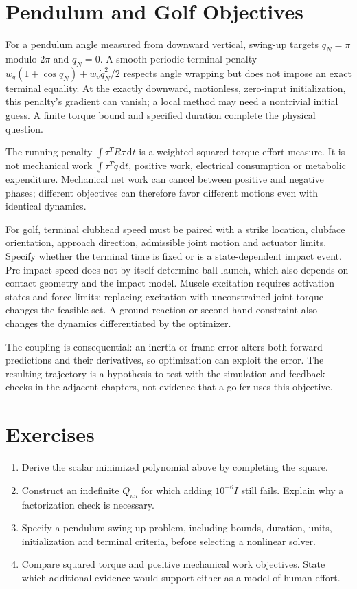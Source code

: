 \section{Pendulum and Golf Objectives}

For a pendulum angle measured from downward vertical, swing-up targets
$q_N=\pi$ modulo $2\pi$ and $\dot q_N=0$. A smooth periodic terminal penalty
$w_q(1+\cos q_N)+w_v\dot q_N^2/2$ respects angle wrapping but does not impose an
exact terminal equality. At the exactly downward, motionless, zero-input
initialization, this penalty's gradient can vanish; a local method may need a
nontrivial initial guess. A finite torque bound and specified duration complete
the physical question.

The running penalty $\int\tau^TR\tau\,\mathrm dt$ is a weighted squared-torque
effort measure. It is not mechanical work $\int\tau^T\dot q\,\mathrm dt$, positive
work, electrical consumption or metabolic expenditure. Mechanical net work can
cancel between positive and negative phases; different objectives can therefore
favor different motions even with identical dynamics.

For golf, terminal clubhead speed must be paired with a strike location, clubface
orientation, approach direction, admissible joint motion and actuator limits.
Specify whether the terminal time is fixed or is a state-dependent impact event.
Pre-impact speed does not by itself determine ball launch, which also depends on
contact geometry and the impact model. Muscle excitation requires activation
states and force limits; replacing excitation with unconstrained joint torque
changes the feasible set. A ground reaction or second-hand constraint also
changes the dynamics differentiated by the optimizer.

The coupling is consequential: an inertia or frame error alters both forward
predictions and their derivatives, so optimization can exploit the error. The
resulting trajectory is a hypothesis to test with the simulation and feedback
checks in the adjacent chapters, not evidence that a golfer uses this objective.

\section*{Exercises}
\begin{enumerate}
 \item Derive the scalar minimized polynomial above by completing the square.
 \item Construct an indefinite $Q_{uu}$ for which adding $10^{-6}I$ still fails.
 Explain why a factorization check is necessary.
 \item Specify a pendulum swing-up problem, including bounds, duration, units,
 initialization and terminal criteria, before selecting a nonlinear solver.
 \item Compare squared torque and positive mechanical work objectives. State
 which additional evidence would support either as a model of human effort.
\end{enumerate}
